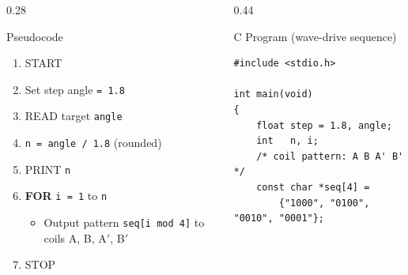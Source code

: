 \documentclass[aspectratio=169]{beamer}
\begin{document}
	\begin{frame}{}

		\vspace*{0.05cm}

		\begin{columns}[T,onlytextwidth]


			\begin{column}{0.28\textwidth}

				\begin{block}{Pseudocode}
					\scriptsize
					\begin{enumerate}
						\item START
						\item Set step angle \texttt{= 1.8}
						\item READ target \texttt{angle}
						\item \texttt{n = angle / 1.8} (rounded)
						\item PRINT \texttt{n}
						\item \textbf{FOR} \texttt{i = 1} to \texttt{n}
						\begin{itemize}\scriptsize
							\item Output pattern \texttt{seq[i mod 4]} to coils A, B, A$'$, B$'$
						\end{itemize}
						\item STOP
					\end{enumerate}
				\end{block}

			\end{column}


			\hspace*{0.3cm}
			\begin{column}{0.44\textwidth}

				\begin{block}{C Program (wave-drive sequence)}

\begin{lstlisting}[style=cstyle,numbers=none,basicstyle=\ttfamily\scriptsize]
#include <stdio.h>

int main(void)
{
	float step = 1.8, angle;
	int   n, i;
	/* coil pattern: A B A' B' */
	const char *seq[4] =
		{"1000", "0100", "0010", "0001"};


\end{lstlisting}
\end{block}
\end{column}
\end{columns}
\end{frame}
\end{document}
